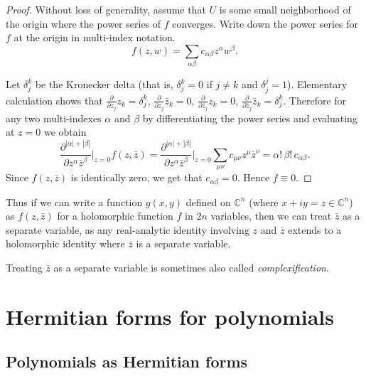 \documentclass[12pt,openany]{book}
\newcommand{\abs}[1]{\left\lvert {#1} \right\rvert}
\newcommand{\C}{{\mathbb{C}}}
\newcommand{\myindex}[1]{#1\index{#1}}
\newcommand{\sectionnewpage}{}
\theoremstyle{plain}
\theoremstyle{remark}
\theoremstyle{definition}
\theoremstyle{exercise}
\theoremstyle{example}
\begin{document}
\begin{proof}
Without loss of generality, assume that $U$ is some small 
neighborhood of the origin where the power series of $f$ converges.
Write down the power series for $f$ at the origin in multi-index
notation.
\begin{equation}
f(z,w) = \sum_{\alpha \beta} c_{\alpha \beta} z^\alpha w^\beta .
\end{equation}

Let $\delta_j^k$ be the Kronecker delta (that is, $\delta_j^k = 0$
if $j \not= k$ and $\delta_j^j = 1$).
Elementary calculation shows that
$\frac{\partial}{\partial z_j} z_k = \delta_j^k$,
$\frac{\partial}{\partial z_j} \bar{z}_k = 0$,
$\frac{\partial}{\partial \bar{z}_j} z_k = 0$,
$\frac{\partial}{\partial \bar{z}_j} \bar{z}_k = \delta_j^k$.
Therefore
for any two multi-indexes $\alpha$ and $\beta$
by differentiating the power series and evaluating at $z=0$
we obtain
\begin{equation}
\frac{\partial^{\abs{\alpha}+\abs{\beta}}}{\partial
z^\alpha \bar{z}^\beta} \Bigg|_{z=0}
f(z,\bar{z})
=
\frac{\partial^{\abs{\alpha}+\abs{\beta}}}{\partial
z^\alpha \bar{z}^\beta} \Bigg|_{z=0}
\sum_{\mu \nu} c_{\mu \nu} z^\mu \bar{z}^\nu
= \alpha ! \, \beta ! \, c_{\alpha \beta} .
\end{equation}
Since $f(z,\bar{z})$ is identically zero, we get that $c_{\alpha \beta} = 0$.
Hence $f \equiv 0$.
\end{proof}

Thus if we can write a function $g(x,y)$ defined on $\C^n$ (where $x+iy = z
\in \C^n$) as $f(z,\bar{z})$ for a holomorphic function $f$ in $2n$
variables, then we can treat $\bar{z}$ as a separate variable, as any
real-analytic identity involving $z$ and $\bar{z}$ extends to a holomorphic
identity where $\bar{z}$ is a separate variable.

Treating $\bar{z}$ as a separate variable is
sometimes also called \emph{\myindex{complexification}}.


\sectionnewpage
\section{Hermitian forms for polynomials} \label{sec:hermformspoly}

\subsection{Polynomials as Hermitian forms}
\end{document}
